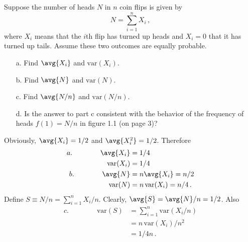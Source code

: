 

Suppose the number of heads $N$ in $n$ coin flips is given by
\begin{equation*}
  N = \sum_{i=1}^n X_i \, ,
\end{equation*}
where $X_i$ means that the $i$th flip has turned up heads and $X_i=0$ that it has turned up tails.
Assume these two outcomes are equally probable.
\begin{itemize}
  \item[a.] Find $\avg{X_i}$ and $\text{var}(X_i)$.
  \item[b.] Find $\avg{N}$ and $\text{var}(N)$.
  \item[c.] Find $\avg{N/n}$ and $\text{var}(N/n)$.
  \item[d.] Is the answer to part c consistent with the behavior of the frequency of heads $f(1)=N/n$ in figure 1.1 (on page 3)?
\end{itemize}


Obviously, $\avg{X_i} = 1/2$ and $\avg{X_i^2} = 1/2$.
Therefore
\begin{align*}
  a. \qquad \qquad
  \avg{X_i} &= 1/4 \\
  \text{var}(X_i) &= 1/4 \\
  b. \qquad \qquad
  \avg{N} &= n \avg{X_i} = n/2 \\
  \text{var}(N) &= n \, \text{var}(X_i) = n / 4 \, .
\end{align*}
Define $S \equiv N/n = \sum_{i=1}^n X_i/n$.
Clearly, $\avg{S} = \avg{N}/n = 1/2$.
Also
\begin{align*}
  c. \qquad \qquad
  \text{var}(S)
  &= \sum_{i=1}^n \text{var}(X_i/n) \\
  &= n \, \text{var}(X_i) / n^2 \\
  &= 1/4n \, .
\end{align*}
